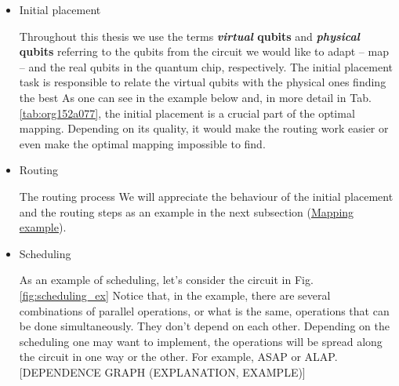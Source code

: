 \begin{itemize}
\item Initial placement
\label{sec:org99b0401}

Throughout this thesis we use the terms \textbf{\emph{virtual} qubits} and \textbf{\emph{physical} qubits} referring to the qubits from the circuit we would like to adapt -- map -- and the real qubits in the quantum chip, respectively.
The initial placement task is responsible to relate the virtual qubits with the physical ones finding the best 
As one can see in the example below and, in more detail in Tab. \ref{tab:org152a077}, the initial placement is a crucial part of the optimal mapping.
Depending on its quality, it would make the routing work easier or even make the optimal mapping impossible to find.

\item Routing
\label{sec:org47f4b64}

The routing process 
We will appreciate the behaviour of the initial placement and the routing steps as an example in the next subsection (\hyperref[sec:org064183c]{Mapping example}).

\item Scheduling
\label{sec:org0650552}

As an example of scheduling, let's consider the circuit in Fig. \ref{fig:scheduling_ex}
Notice that, in the example, there are several combinations of parallel operations,
or what is the same, operations that can be done simultaneously.
They don't depend on each other.
Depending on the scheduling one may want to implement,
the operations will be spread along the circuit in one way or the other.
For example, ASAP or ALAP.
[DEPENDENCE GRAPH (EXPLANATION, EXAMPLE)]

\begin{figure}
    \centering

\label{fig:scheduling_ex_orig}

\label{fig:scheduling_ex_asap}


\end{figure}
\end{itemize}
